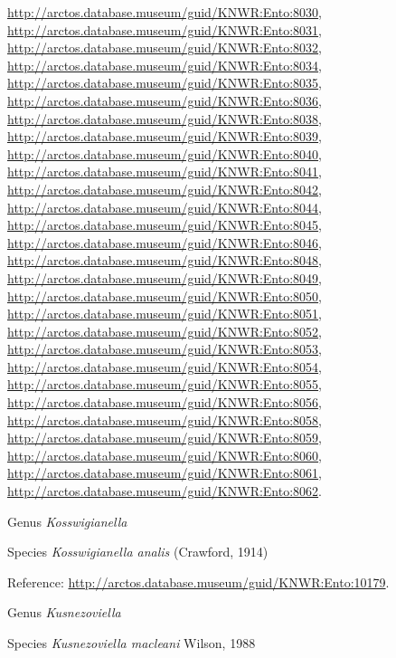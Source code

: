 \documentclass[9pt, article]{memoir}
\begin{document}
\begin{multicols}{2}
\url{http://arctos.database.museum/guid/KNWR:Ento:8030}, 
\url{http://arctos.database.museum/guid/KNWR:Ento:8031}, 
\url{http://arctos.database.museum/guid/KNWR:Ento:8032}, 
\url{http://arctos.database.museum/guid/KNWR:Ento:8034}, 
\url{http://arctos.database.museum/guid/KNWR:Ento:8035}, 
\url{http://arctos.database.museum/guid/KNWR:Ento:8036}, 
\url{http://arctos.database.museum/guid/KNWR:Ento:8038}, 
\url{http://arctos.database.museum/guid/KNWR:Ento:8039}, 
\url{http://arctos.database.museum/guid/KNWR:Ento:8040}, 
\url{http://arctos.database.museum/guid/KNWR:Ento:8041}, 
\url{http://arctos.database.museum/guid/KNWR:Ento:8042}, 
\url{http://arctos.database.museum/guid/KNWR:Ento:8044}, 
\url{http://arctos.database.museum/guid/KNWR:Ento:8045}, 
\url{http://arctos.database.museum/guid/KNWR:Ento:8046}, 
\url{http://arctos.database.museum/guid/KNWR:Ento:8048}, 
\url{http://arctos.database.museum/guid/KNWR:Ento:8049}, 
\url{http://arctos.database.museum/guid/KNWR:Ento:8050}, 
\url{http://arctos.database.museum/guid/KNWR:Ento:8051}, 
\url{http://arctos.database.museum/guid/KNWR:Ento:8052}, 
\url{http://arctos.database.museum/guid/KNWR:Ento:8053}, 
\url{http://arctos.database.museum/guid/KNWR:Ento:8054}, 
\url{http://arctos.database.museum/guid/KNWR:Ento:8055}, 
\url{http://arctos.database.museum/guid/KNWR:Ento:8056}, 
\url{http://arctos.database.museum/guid/KNWR:Ento:8058}, 
\url{http://arctos.database.museum/guid/KNWR:Ento:8059}, 
\url{http://arctos.database.museum/guid/KNWR:Ento:8060}, 
\url{http://arctos.database.museum/guid/KNWR:Ento:8061}, 
\url{http://arctos.database.museum/guid/KNWR:Ento:8062}.

\vspace{6pt}\noindent\hspace{30pt}Genus \textit{Kosswigianella}


\vspace{6pt}\noindent\hspace{36pt}Species \textit{Kosswigianella analis} (Crawford, 1914)


\vspace{6pt}Reference: 
\url{http://arctos.database.museum/guid/KNWR:Ento:10179}.

\vspace{6pt}\noindent\hspace{30pt}Genus \textit{Kusnezoviella}


\vspace{6pt}\noindent\hspace{36pt}Species \textit{Kusnezoviella macleani} Wilson, 1988



\end{multicols}
\end{document}
